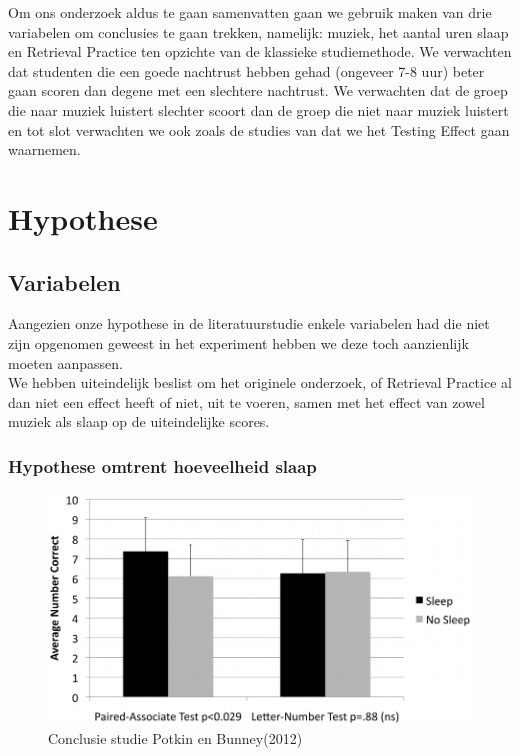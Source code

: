 \documentclass{hogent-article}
\begin{document}
\par
\noindent
Om ons onderzoek aldus te gaan samenvatten gaan we gebruik maken van drie variabelen om conclusies te gaan trekken, namelijk: muziek, het aantal uren slaap en Retrieval Practice ten opzichte van de klassieke studiemethode. We verwachten dat studenten die een goede nachtrust hebben gehad (ongeveer 7-8 uur) beter gaan scoren dan degene met een slechtere nachtrust. We verwachten dat de groep die naar muziek luistert slechter scoort dan de groep die niet naar muziek luistert en tot slot verwachten we ook zoals de studies van \textcite{Roediger2006} dat we het Testing Effect gaan waarnemen.

\section{Hypothese}
\subsection{Variabelen}
Aangezien onze hypothese in de literatuurstudie enkele variabelen had die niet zijn opgenomen geweest in het experiment hebben we deze toch aanzienlijk moeten aanpassen.\\

\noindent
We hebben uiteindelijk beslist om het originele onderzoek, of Retrieval Practice al dan niet een effect heeft of niet, uit te voeren, samen met het effect van zowel muziek als slaap op de uiteindelijke scores.

\subsubsection{Hypothese omtrent hoeveelheid slaap}

\begin{figure}[H]
	\includegraphics[width=\linewidth]{hypotheseGraph1}
	\caption{Conclusie studie Potkin en Bunney(2012)}
\end{figure}
\end{document}
